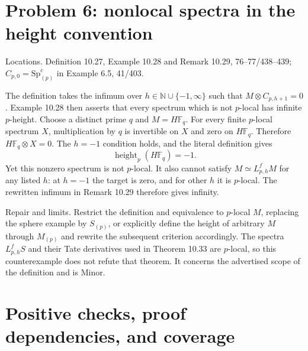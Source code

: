 \documentclass[10pt]{article}
\begin{document}
\section*{Problem 6: nonlocal spectra in the height convention}
Locations. Definition 10.27, Example 10.28 and Remark 10.29, 76–77/438–439; \(C_{p,0}=\mathrm{Sp}^c_{(p)}\) in Example 6.5, 41/403.\par
The definition takes the infimum over \(h\in\mathbb N\cup\{-1,\infty\}\) such that \(M\otimes C_{p,h+1}=0\). Example 10.28 then asserts that every spectrum which is not \(p\)-local has infinite \(p\)-height. Choose a distinct prime \(q\) and \(M=H\mathbb F_q\). For every finite \(p\)-local spectrum \(X\), multiplication by \(q\) is invertible on \(X\) and zero on \(H\mathbb F_q\). Therefore \(H\mathbb F_q\otimes X=0\). The \(h=-1\) condition holds, and the literal definition gives \[\operatorname{height}_p(H\mathbb F_q)=-1.\] Yet this nonzero spectrum is not \(p\)-local. It also cannot satisfy \(M\simeq L^f_{p,h}M\) for any listed \(h\): at \(h=-1\) the target is zero, and for other \(h\) it is \(p\)-local. The rewritten infimum in Remark 10.29 therefore gives infinity.\par
Repair and limits. Restrict the definition and equivalence to \(p\)-local \(M\), replacing the sphere example by \(S_{(p)}\), or explicitly define the height of arbitrary \(M\) through \(M_{(p)}\) and rewrite the subsequent criterion accordingly. The spectra \(L^f_{p,h}S\) and their Tate derivatives used in Theorem 10.33 are \(p\)-local, so this counterexample does not refute that theorem. It concerns the advertised scope of the definition and is Minor.\par
\section*{Positive checks, proof dependencies, and coverage}
\end{document}
